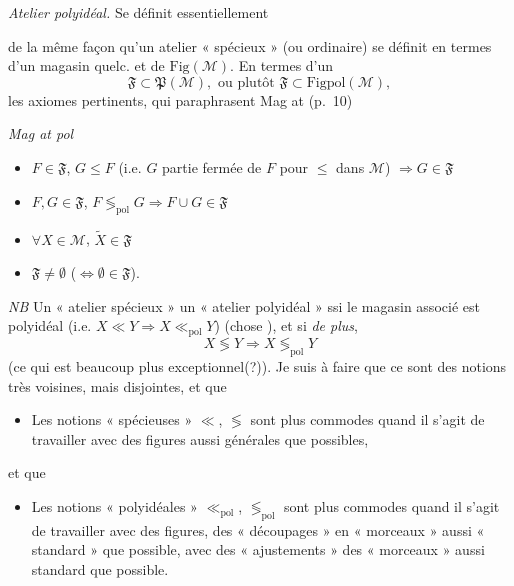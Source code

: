 \documentclass[11pt,a4paper]{article}
\begin{document}
\emph{Atelier polyidéal.} Se définit essentiellement 

de la même façon qu'un atelier « spécieux » (ou ordinaire) se définit en termes
d'un magasin quelc. et de $\mathrm{Fig}(\mathcal{M})$. En termes d'un
\[
  \mathfrak{F} \subset \mathfrak{P}(\mathcal{M}), \text{ ou plutôt }
  \mathfrak{F} \subset \mathrm{Figpol}(\mathcal{M}),
\]
les axiomes pertinents, qui paraphrasent Mag at (p.~10) 

\emph{Mag at pol}
\begin{itemize}
  \item[a)] $F \in \mathfrak{F}$, $G \leq F$ (i.e. $G$ partie fermée de $F$ pour
    $\leq$ dans $\mathcal{M}$) $\Longrightarrow G \in \mathfrak{F}$
  \item[b)] $F, G \in \mathfrak{F}$, $F \lessgtr_{\mathrm{pol}} G \Longrightarrow F \cup G \in \mathfrak{F}$
  \item[c)] $\forall X \in \mathcal{M}$, $\widetilde{X} \in \mathfrak{F}$
  \item[c')] $\mathfrak{F} \neq \emptyset$ ($\Longleftrightarrow \emptyset \in \mathfrak{F}$).
\end{itemize}

\emph{NB} Un « atelier spécieux »   un « atelier
polyidéal » ssi le magasin associé est polyidéal \struck{\ill{}} (i.e.
$X \ll Y \Rightarrow X \ll_{\mathrm{pol}} Y$) \struck{\ill{}} (chose 
), et si \emph{de plus},
\[
  X \lessgtr Y \Longrightarrow X \lessgtr_{\mathrm{pol}} Y
\]
(ce qui est beaucoup plus exceptionnel(?)). Je suis  à faire
\ill{}  que ce sont des notions très voisines, mais
disjointes, et que
\begin{itemize}
  \item[a)] Les notions « spécieuses » \struck{\ill{}} $\ll$, $\lessgtr$ sont
    plus commodes quand il s'agit de travailler avec des figures aussi
    générales que possibles,
\end{itemize}
et que
\begin{itemize}
  \item[b)] Les notions « polyidéales » $\ll_{\mathrm{pol}}$,
    $\lessgtr_{\mathrm{pol}}$ sont plus commodes quand il s'agit de travailler
    avec des figures,  des « découpages » 
    en « morceaux » aussi « standard » que possible, avec des « ajustements »
    \struck{\ill{}} des « morceaux » aussi  standard que possible.
\end{itemize}
\end{document}
